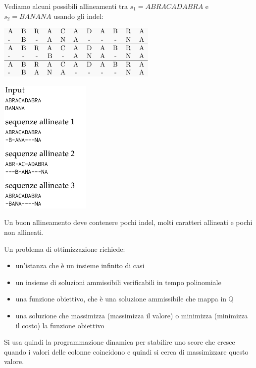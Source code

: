 \documentclass[a4paper,12pt, oneside]{book}
\begin{document}
\begin{esempio}
  Vediamo alcuni possibili allineamenti tra $s_1=ABRACADABRA$ e
  $s_2=BANANA$ usando gli indel:
  \begin{center}
    \includegraphics[scale = 0.5]{img/al.png}
  \end{center}
  \begin{center}
    \includegraphics[scale = 0.7]{img/indel.png}
  \end{center}
\end{esempio}
Un buon allineamento deve contenere pochi indel, molti caratteri
allineati e pochi non allineati.\\
\begin{definizione}
  Un problema di ottimizzazione richiede:
  \begin{itemize}
    \item un'istanza che è un insieme infinito di casi
    \item un insieme di soluzioni ammissibili verificabili in tempo
    polinomiale
    \item una funzione obiettivo, che è una soluzione ammissibile che
    mappa in $\mathbb{Q}$
    \item una soluzione che massimizza (massimizza il valore) o
    minimizza (minimizza il costo) la funzione obiettivo
  \end{itemize}
\end{definizione}
Si usa quindi la programmazione dinamica per stabilire uno score che
cresce quando i valori delle colonne coincidono e quindi si cerca di
massimizzare questo valore.\\
\end{document}
